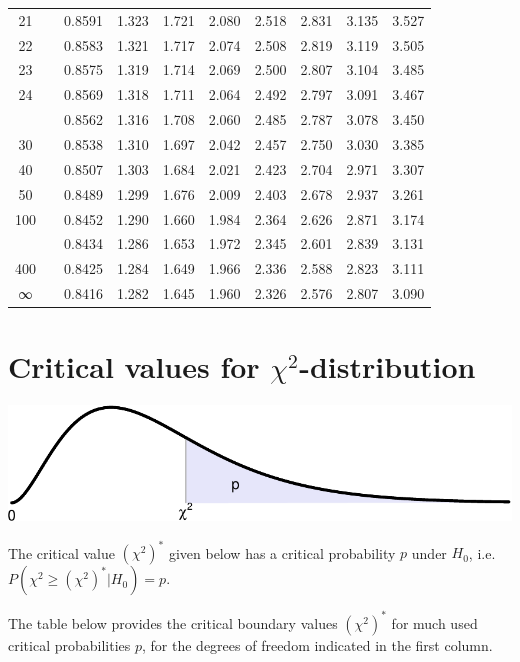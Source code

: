 \documentclass[
]{book}
\begin{document}
\begin{tabular}{cccccccccc}
21 &  & 0.8591 & 1.323 & 1.721 & 2.080 & 2.518 & 2.831 & 3.135 & 3.527\\
22 &  & 0.8583 & 1.321 & 1.717 & 2.074 & 2.508 & 2.819 & 3.119 & 3.505\\
23 &  & 0.8575 & 1.319 & 1.714 & 2.069 & 2.500 & 2.807 & 3.104 & 3.485\\
24 &  & 0.8569 & 1.318 & 1.711 & 2.064 & 2.492 & 2.797 & 3.091 & 3.467\\
\addlinespace
25 &  & 0.8562 & 1.316 & 1.708 & 2.060 & 2.485 & 2.787 & 3.078 & 3.450\\
30 &  & 0.8538 & 1.310 & 1.697 & 2.042 & 2.457 & 2.750 & 3.030 & 3.385\\
40 &  & 0.8507 & 1.303 & 1.684 & 2.021 & 2.423 & 2.704 & 2.971 & 3.307\\
50 &  & 0.8489 & 1.299 & 1.676 & 2.009 & 2.403 & 2.678 & 2.937 & 3.261\\
100 &  & 0.8452 & 1.290 & 1.660 & 1.984 & 2.364 & 2.626 & 2.871 & 3.174\\
\addlinespace
200 &  & 0.8434 & 1.286 & 1.653 & 1.972 & 2.345 & 2.601 & 2.839 & 3.131\\
400 &  & 0.8425 & 1.284 & 1.649 & 1.966 & 2.336 & 2.588 & 2.823 & 3.111\\
∞ &  & 0.8416 & 1.282 & 1.645 & 1.960 & 2.326 & 2.576 & 2.807 & 3.090\\
\bottomrule
\end{tabular}

\hypertarget{app:criticalchi2values}{%
\chapter{\texorpdfstring{Critical values for \(\chi^2\)-distribution}{Critical values for \textbackslash chi\^{}2-distribution}}\label{app:criticalchi2values}}

\includegraphics{QMS-EN_files/figure-latex/criticalchi2values-auxiliaryfigure-1.pdf}

The critical value \((\chi^2)^*\) given below has a critical probability \(p\) under
\(H_0\), i.e.~\(P(\chi^2 \geq (\chi^2)^*|H_0)=p\).

The table below provides the critical boundary values \((\chi^2)^*\) for much used critical probabilities \(p\), for the degrees of freedom indicated in the first column.
\end{document}
